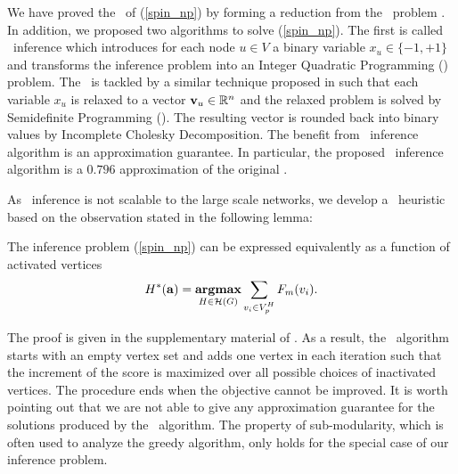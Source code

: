 {We have proved the \nphardness\ of (\ref{spin_np}) by forming a reduction from the \maxcut\ problem \citep{Garey90computers}.
In addition, we proposed two algorithms to solve (\ref{spin_np}).
The first is called {\sdp\ inference} which introduces for each node $u\in V$ a binary variable $x_u\in\{-1,+1\}$ and transforms the inference problem into an Integer Quadratic Programming (\iqp) problem.
The \iqp\ is tackled by a similar technique proposed in \citep{Geomans1995improved} such that each variable $x_u$ is relaxed to a vector $\mathbf {v}_u\in\mathbb{R}^n$ and the relaxed problem is solved by Semidefinite Programming (\sdp). 
The resulting vector is rounded back into binary values by Incomplete Cholesky Decomposition.
The benefit from \sdp\ inference algorithm is an approximation guarantee. 
In particular, the proposed \sdp\ inference algorithm is a $0.796$ approximation of the original \iqp.

As \sdp\ inference is not scalable to the large scale networks, we develop a \greedy\ heuristic based on the observation stated in the following lemma:
\begin{lemma}
	The inference problem (\ref{spin_np}) can be expressed equivalently as a function of activated vertices
	\begin{align*}
		H^{*}(\mathbf {a}) = \underset{{H \in {\cal H}(G)}}{\textbf{argmax}} \sum_{ \substack{v_i\in V^H_{\sc p}}}F_m(v_i). \nonumber 
	\end{align*}
\end{lemma}
\noindent
The proof is given in the supplementary material of . 
As a result, the \greedy\ algorithm starts with an empty vertex set and adds one vertex in each iteration such that the increment of the score is maximized over all possible choices of inactivated vertices.
The procedure ends when the objective cannot be improved.  
It is worth pointing out that we are not able to give any approximation guarantee for the solutions produced by the \greedy\ algorithm.
The property of sub-modularity, which is often used to analyze the greedy algorithm, only holds for the special case of our inference problem.


}
